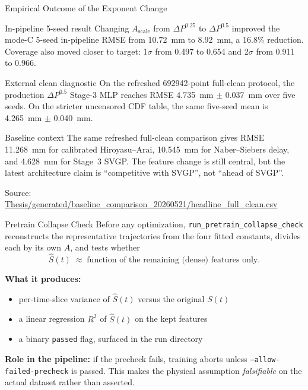\documentclass[UTF8,aspectratio=169]{ctexbeamer}
\newcommand{\good}[1]{\textcolor{green!45!black}{#1}}
\newcommand{\src}[1]{\vfill{\tiny\textcolor{gray!75!black}{Source: \url{#1}}}}
\begin{document}
\begin{frame}{Empirical Outcome of the Exponent Change}
\small
\begin{block}{In-pipeline 5-seed result}
Changing \(A_{\mathrm{scale}}\) from \(\Delta P^{0.25}\) to \(\Delta P^{0.5}\) improved the mode-C 5-seed in-pipeline RMSE from \SI{10.72}{mm} to \SI{8.92}{mm}, a \good{16.8\% reduction}. Coverage also moved closer to target: 1\(\sigma\) from 0.497 to 0.654 and 2\(\sigma\) from 0.911 to 0.966.
\end{block}

\begin{block}{External clean diagnostic}
On the refreshed \num{692942}-point full-clean protocol, the production
\(\Delta P^{0.5}\) Stage-3 MLP reaches \good{RMSE \SI{4.735}{mm} \(\pm\) \SI{0.037}{mm}}
over five seeds. On the stricter uncensored CDF table, the same five-seed mean is
\good{\SI{4.265}{mm} \(\pm\) \SI{0.040}{mm}}.
\end{block}

\begin{block}{Baseline context}
The same refreshed full-clean comparison gives RMSE \SI{11.268}{mm} for
calibrated Hiroyasu--Arai, \SI{10.545}{mm} for Naber--Siebers delay, and
\SI{4.628}{mm} for Stage~3 SVGP. The feature change is still central, but the
latest architecture claim is ``competitive with SVGP'', not ``ahead of SVGP''.
\end{block}

\src{Thesis/generated/baseline_comparison_20260521/headline_full_clean.csv}
\end{frame}

\begin{frame}{Pretrain Collapse Check}
Before any optimization, \texttt{run\_pretrain\_collapse\_check} reconstructs the representative trajectories from the four fitted constants, divides each by its own $A$, and tests whether
\[
\hat S(t)\;\approx\;\text{function of the remaining (dense) features only}.
\]

\vspace{0.3em}
\textbf{What it produces:}
\begin{itemize}
  \item per-time-slice variance of $\hat S(t)$ versus the original $S(t)$
  \item a linear regression $R^{2}$ of $\hat S(t)$ on the kept features
  \item a binary \texttt{passed} flag, surfaced in the run directory
\end{itemize}

\vspace{0.3em}
\textbf{Role in the pipeline:} if the precheck fails, training aborts unless \texttt{--allow-failed-precheck} is passed. This makes the physical assumption \emph{falsifiable} on the actual dataset rather than asserted.
\end{frame}
\end{document}
